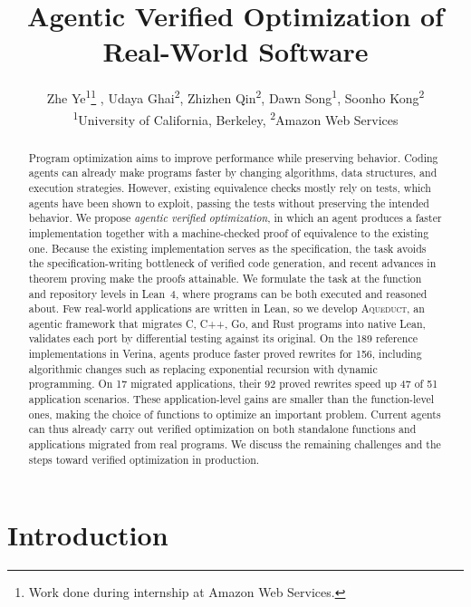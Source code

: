 \documentclass{article}
\title{Agentic Verified Optimization of Real-World Software}
\author{%
Zhe Ye\textsuperscript{1}\thanks{Work done during internship at Amazon Web Services.} , Udaya Ghai\textsuperscript{2}, Zhizhen Qin\textsuperscript{2}, Dawn Song\textsuperscript{1}, Soonho Kong\textsuperscript{2} \\
\textsuperscript{1}University of California, Berkeley, \textsuperscript{2}Amazon Web Services
}
\newcommand{\aqueduct}{\textsc{Aqueduct}\xspace}
\newcommand{\verina}{Verina\xspace}
\begin{document}
\maketitle

\begin{abstract}
Program optimization aims to improve performance while preserving behavior.
Coding agents can already make programs faster by changing algorithms, data structures, and execution strategies.
However, existing equivalence checks mostly rely on tests, which agents have been shown to exploit, passing the tests without preserving the intended behavior.
We propose \emph{agentic verified optimization}, in which an agent produces a faster implementation together with a machine-checked proof of equivalence to the existing one.
Because the existing implementation serves as the specification, the task avoids the specification-writing bottleneck of verified code generation, and recent advances in theorem proving make the proofs attainable.
We formulate the task at the function and repository levels in Lean~4, where programs can be both executed and reasoned about.
Few real-world applications are written in Lean, so we develop \aqueduct{}, an agentic framework that migrates C, C++, Go, and Rust programs into native Lean, validates each port by differential testing against its original.
On the 189 reference implementations in \verina{}, agents produce faster proved rewrites for 156, including algorithmic changes such as replacing exponential recursion with dynamic programming.
On 17 migrated applications, their 92 proved rewrites speed up 47 of 51 application scenarios.
These application-level gains are smaller than the function-level ones, making the choice of functions to optimize an important problem.
Current agents can thus already carry out verified optimization on both standalone functions and applications migrated from real programs.
We discuss the remaining challenges and the steps toward verified optimization in production.
\end{abstract}

\section{Introduction}
\label{sec:intro}
\end{document}
